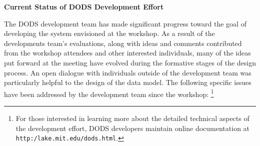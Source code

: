 \large
\bigskip
\noindent
{\bf Current Status of DODS Development Effort}
\medskip
\normalsize

\noindent The DODS development team has made significant progress toward the
goal of developing the system envisioned at the workshop.  As a result of the
developments team's evaluations, along with ideas and comments contributed
from the workshop attendees and other interested individuals, many of the
ideas put forward at the meeting have evolved during the formative stages of
the design process.  An open dialogue with individuals outside of the
development team was particularly helpful to the design of the data model.
The following specific issues have been addressed by the development team
since the workshop:{\renewcommand{\baselinestretch}{1.0} \footnote{For those
    interested in learning more about the detailed technical aspects of the
    \dods development effort, DODS developers maintain online documentation
    at {\tt http:/lake.mit.edu/dods.html}.}}

